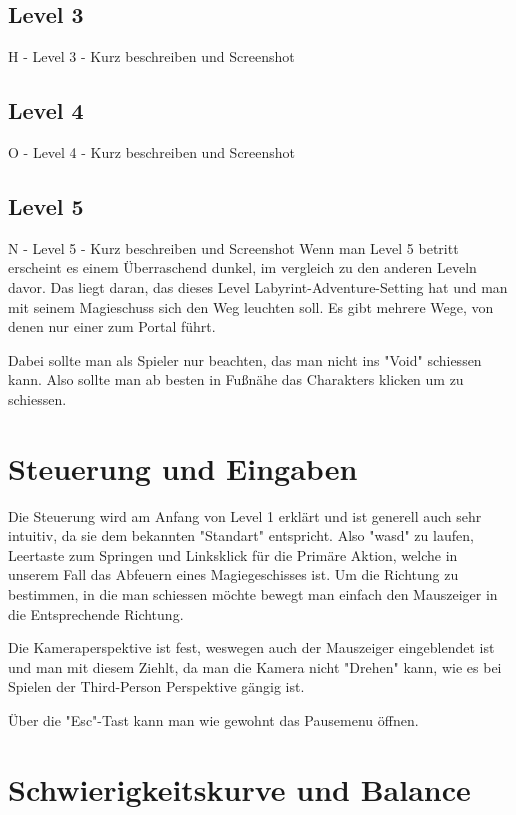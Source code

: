 \documentclass[oneside]{ausarbeitung}
\begin{document}
\subsection{Level 3}

H  - Level 3
   - Kurz beschreiben und Screenshot


\subsection{Level 4}

O  - Level 4
   - Kurz beschreiben und Screenshot


\subsection{Level 5}

N  - Level 5
   - Kurz beschreiben und Screenshot
Wenn man Level 5 betritt erscheint es einem Überraschend dunkel, im vergleich zu den anderen Leveln davor. 
Das liegt daran, das dieses Level Labyrint-Adventure-Setting hat und man mit seinem Magieschuss sich den Weg leuchten soll.
Es gibt mehrere Wege, von denen nur einer zum Portal führt. 

Dabei sollte man als Spieler nur beachten, das man nicht ins "Void" schiessen kann. 
Also sollte man ab besten in Fußnähe das Charakters klicken um zu schiessen.


\section{Steuerung und Eingaben}

Die Steuerung wird am Anfang von Level 1 erklärt und ist generell auch sehr intuitiv, da sie dem bekannten "Standart" entspricht. 
Also "wasd" zu laufen, Leertaste zum Springen und Linksklick für die Primäre Aktion, welche in unserem Fall das Abfeuern eines Magiegeschisses ist. 
Um die Richtung zu bestimmen, in die man schiessen möchte bewegt man einfach den Mauszeiger in die Entsprechende Richtung. 

Die Kameraperspektive ist fest, weswegen auch der Mauszeiger eingeblendet ist und man mit diesem Ziehlt, da man die Kamera nicht "Drehen" kann, 
wie es bei Spielen der Third-Person Perspektive gängig ist. 

Über die "Esc"-Tast kann man wie gewohnt das Pausemenu öffnen. 


\section{Schwierigkeitskurve und Balance}
\end{document}
